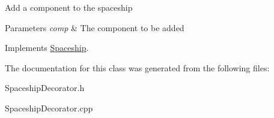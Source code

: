 Add a component to the spaceship 
\begin{DoxyParams}{Parameters}
{\em comp} & The component to be added \\
\hline
\end{DoxyParams}


Implements \hyperlink{classSpaceship_ac1b4673a691cd100708ddea08cd9f192}{Spaceship}.



The documentation for this class was generated from the following files\+:\begin{DoxyCompactItemize}
\item 
Spaceship\+Decorator.\+h\item 
Spaceship\+Decorator.\+cpp\end{DoxyCompactItemize}

